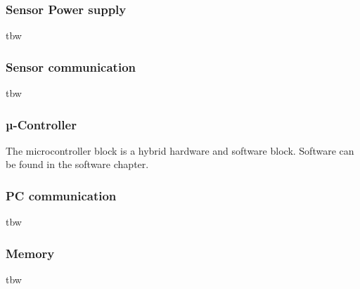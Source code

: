 \subsubsection{Sensor Power supply}
tbw

\subsubsection{Sensor communication}
tbw
%




\subsubsection{µ-Controller}
The microcontroller block is a hybrid hardware and software block. Software can be found in the software chapter.\\


\subsubsection{PC communication}
tbw

\subsubsection{Memory}
tbw

